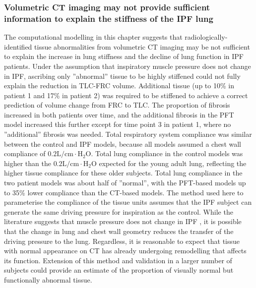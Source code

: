 \subsubsection{Volumetric CT imaging may not provide sufficient information to explain the stiffness of the IPF lung}
The computational modelling in this chapter suggests that radiologically-identified tissue abnormalities from volumetric CT imaging may be not sufficient to explain the increase in lung stiffness and the decline of lung function in IPF patients. Under the assumption that inspiratory muscle pressure does not change in IPF, ascribing only ''abnormal'' tissue to be highly stiffened could not fully explain the reduction in TLC-FRC volume. Additional tissue (up to 10\% in patient 1 and 17\% in patient 2) was required to be stiffened to achieve a correct prediction of volume change from FRC to TLC. The proportion of fibrosis increased in both patients over time, and the additional fibrosis in the PFT model increased this further except for time point 3 in patient 1, where no ''additional'' fibrosis was needed. Total respiratory system compliance was similar between the control and IPF models, because all models assumed a chest wall compliance of $\mathrm{0.2 L/cm \cdot H_2O}$. Total lung compliance in the control models was higher than the $\mathrm{0.2 L/cm \cdot H_2O}$ expected for the young adult lung, reflecting the higher tissue compliance for these older subjects. Total lung compliance in the two patient models was about half of ''normal'', with the PFT-based models up to 35\% lower compliance than the CT-based models. The method used here to parameterise the compliance of the tissue units assumes that the IPF subject can generate the same driving pressure for inspiration as the control. While the literature suggests that muscle pressure does not change in IPF \citep{de1980inspiratory}, it is possible that the change in lung and chest wall geometry reduces the transfer of the driving pressure to the lung. Regardless, it is reasonable to expect that tissue with normal appearance on CT has already undergoing remodelling that affects its function. Extension of this method and validation in a larger number of subjects could provide an estimate of the proportion of visually normal but functionally abnormal tissue. 

